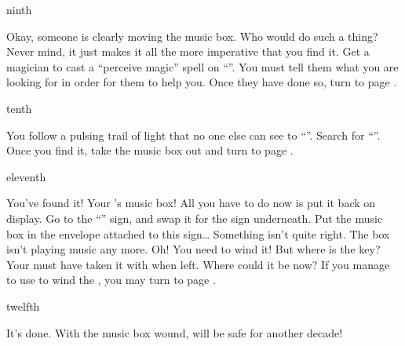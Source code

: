 \documentclass[greennotebook]{NeptuneBall}
\begin{document}
\begin{page}{ninth}

Okay, someone is clearly moving the music box. Who would do such a thing? Never mind, it just makes it all the more imperative that you find it. Get a magician to cast a ``perceive magic'' spell on ``\sPacketC{}''. You must tell them what you are looking for in order for them to help you. Once they have done so, turn to page .

\end{page}

\begin{page}{tenth}

You follow a pulsing trail of light that no one else can see to ``\sDungeons{}''. Search for ``\sPacketD{}''. Once you find it, take the music box out and turn to page .

\end{page}

\begin{page}{eleventh}

You've found it! Your \cAthena{\parent}'s music box! All you have to do now is put it back on display. Go to the ``\sArtifactZero{}'' sign, and swap it for the sign underneath. Put the music box in the envelope attached to this sign\ldots{} Something isn't quite right. The box isn't playing music any more. Oh! You need to wind it! But where is the key? Your \cAthena{\parent} must have taken it with \cAthean{\them} when \cAthena{\they} left. Where could it be now? If you manage to use \iMusicBoxKey{} to wind the \iMusicBox{}, you may turn to page .

\end{page}

\begin{page}{twelfth}

It's done. With the music box wound, \pAtlantis{} will be safe for another decade!

\end{page}

\endnotebook
\end{document}

